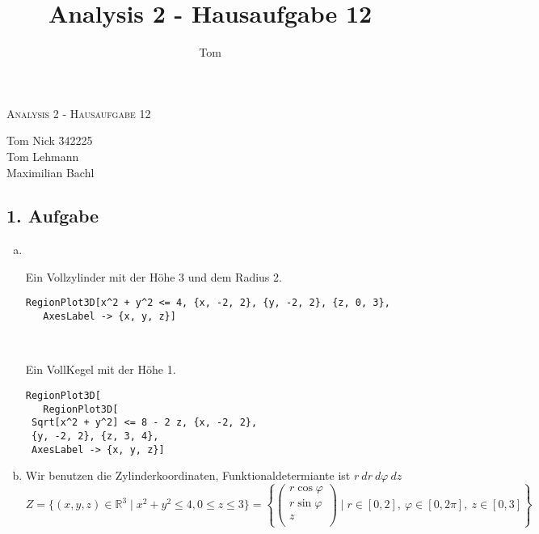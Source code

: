 \documentclass[10pt,a4paper,parskip=half]{scrartcl}
\author{Tom}
\title{Analysis 2 - Hausaufgabe 12}
\newcommand{\R}{\mathbb{R}}
\newcommand{\vecthree}[3]{\begin{pmatrix}#1\\#2\\#3\\\end {pmatrix}}
\begin{document}
\begin{center}
\textsc{\Large{Analysis 2 - Hausaufgabe 12}} \\
\end{center}
\begin{tabbing}
Tom Nick \hspace{1.4cm}\= 342225\\
Tom Lehmann\\
Maximilian Bachl
\end{tabbing}
\subsection*{1. Aufgabe}
\begin{enumerate}[(a)]
   \item \ \\
   \begin{minipage}{0.50\columnwidth}
   Ein Vollzylinder mit der Höhe 3 und dem Radius 2.
   \begin{lstlisting}[caption= Mathematica Code für die Menge Z]
   RegionPlot3D[x^2 + y^2 <= 4, {x, -2, 2}, {y, -2, 2}, {z, 0, 3}, 
   AxesLabel -> {x, y, z}]
   \end{lstlisting}
   \end{minipage}
   \begin{minipage}{0.50\columnwidth}
   \begin{center}
   \end{center}
   \end{minipage}
   \ \\
   \begin{minipage}{0.50\columnwidth}
   Ein VollKegel mit der Höhe 1.
   \begin{lstlisting}[caption= Mathematica Code für die Menge K]
   RegionPlot3D[
   RegionPlot3D[
 Sqrt[x^2 + y^2] <= 8 - 2 z, {x, -2, 2}, 
 {y, -2, 2}, {z, 3, 4}, 
 AxesLabel -> {x, y, z}]
   \end{lstlisting}
   \end{minipage}
   \begin{minipage}{0.50\columnwidth}
   \begin{center}
   \end{center}
   \end{minipage}
   \item  
   Wir benutzen die Zylinderkoordinaten, Funktionaldetermiante ist $r~dr ~ d\varphi ~dz$
   \[ Z = \{ (x,y,z) \in \R^3  \mid x^2 + y^2 \le 4, 0 \le z \le 3\} = \left\{ \vecthree{r \cos \varphi}{r\sin \varphi}{z} \mid r \in [0,2] ,~ \varphi \in [0,2\pi], ~z \in [0,3] \right\} \] 

\end{enumerate}
\end{document}
